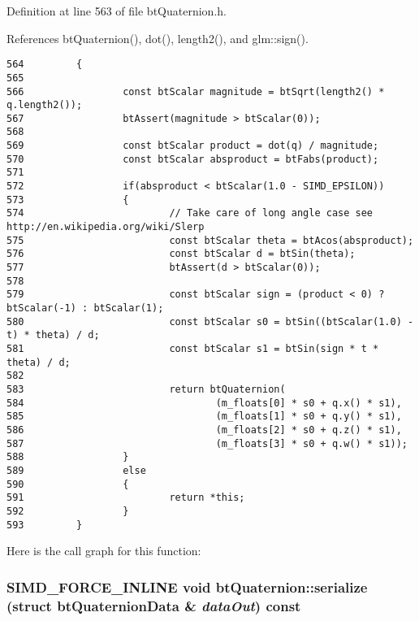 Definition at line 563 of file btQuaternion.h.

References btQuaternion(), dot(), length2(), and glm::sign().

\begin{Code}\begin{verbatim}564         {
565 
566                 const btScalar magnitude = btSqrt(length2() * q.length2());
567                 btAssert(magnitude > btScalar(0));
568                 
569                 const btScalar product = dot(q) / magnitude;
570                 const btScalar absproduct = btFabs(product);
571                 
572                 if(absproduct < btScalar(1.0 - SIMD_EPSILON))
573                 {
574                         // Take care of long angle case see http://en.wikipedia.org/wiki/Slerp
575                         const btScalar theta = btAcos(absproduct);
576                         const btScalar d = btSin(theta);
577                         btAssert(d > btScalar(0));
578                         
579                         const btScalar sign = (product < 0) ? btScalar(-1) : btScalar(1);
580                         const btScalar s0 = btSin((btScalar(1.0) - t) * theta) / d;
581                         const btScalar s1 = btSin(sign * t * theta) / d;
582                         
583                         return btQuaternion(
584                                 (m_floats[0] * s0 + q.x() * s1),
585                                 (m_floats[1] * s0 + q.y() * s1),
586                                 (m_floats[2] * s0 + q.z() * s1),
587                                 (m_floats[3] * s0 + q.w() * s1));
588                 }
589                 else
590                 {
591                         return *this;
592                 }
593         }
\end{verbatim}
\end{Code}




Here is the call graph for this function:\hypertarget{classbt_quaternion_8bc3a5908e5863652549ac6cf8830ee5}{
\subsubsection[serialize]{\setlength{\rightskip}{0pt plus 5cm}SIMD\_\-FORCE\_\-INLINE void btQuaternion::serialize (struct btQuaternionData \& {\em dataOut}) const}}
\label{classbt_quaternion_8bc3a5908e5863652549ac6cf8830ee5}




